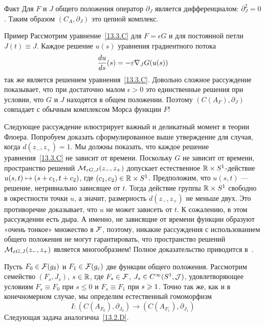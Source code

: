 \begin{thm}{Факт}\label{13.3.F}
  Для $F$ и $J$ общего положения оператор $\partial_{J}$ является
  дифференциалом: $\partial_{J}^{2}=0$.
  Таким образом $(C_{A},\partial_{J})$ это цепной комплекс.
\end{thm}

\begin{thm}{Пример}\label{13.3.G}
Рассмотрим уравнение~\ref{13.3.C} для $F = \epsilon G$ и для
  постоянной петли $J(t)\equiv J$.
  Каждое решение $u(s)$ уравнения градиентного потока
  \[
  \frac{d u}{d s} (s) = -\varepsilon\nabla_{J} G(u(s))
  \]
  так же является решением уравнения~\ref{13.3.C}.
Довольно сложное рассуждение \cite[Lemma 7.1]{HS} показывает, что при
  достаточно малом $\epsilon>0$ это единственные решения при
  условии, что $G$ и $J$ находятся в общем положении.
  Поэтому $(C(A_{F}),\partial_{J})$ совпадает с обычным комплексом
  Морса функции $F$!
\end{thm}

Следующее рассуждение илюстрирует важный и деликатный
момент в теории Флоера.
Попробуем доказать сформулированное выше утверждение для случая, когда
$d(z_{-}, z_{+})=1$.  
Мы должны показать, что каждое решение уравнения~\ref{13.3.C} не
зависит от времени.
Поскольку $G$ не зависит от времени, пространство решений
$\mathcal{M}_{\varepsilon G,J}(z_{-},z_{+})$ допускает естественное $\mathbb{R}\times
S^{1}$-действие $u(s, t) \mapsto (s\z+c_{1},t+c_{2})$, где
$(c_{1},c_{2})\in\mathbb{R}\times S^{1}$.
Предположим, что $u(s, t)$ — решение, нетривиально зависящее от $t$.
Тогда действие группы $\mathbb{R}\times S^{1}$ свободно в окрестности точки $u$,
а значит, размерность $d(z_{-}, z_{+})$ не меньше двух.
Это противоречие доказывает, что $u$ не может зависеть от $t$.
К сожалению, в этом рассуждении есть дыра.
А именно, не зависящие от времени функции образуют «очень тонкое» множество в $\mathcal{F}$, поэтому, никакие рассуждения с использованием общего положения не могут гарантировать, что пространство решений $\mathcal{M}_{\varepsilon G,J}(z_{-}, z_{+})$ является многообразием!
Полное доказательство приводится в~\cite{HS}.

Пусть $F_{0}\in\mathcal{F}(g_{\delta})$ и $F_{1}\in\mathcal{F}(g_{\varepsilon})$ две
функции общего положения. 
Рассмотрим семейство $(F_{s}, J_{s})$, $s\in\mathbb{R}$, где
$F_{s}\in\mathcal{F}$, $J_{s}\in C^{\infty}(S^{1},\mathcal{J})$, удовлетворяющее
условиям 
$F_{s}\equiv F_{0}$ при $s\le0$ и $F_{s}\equiv F_{1}$ при $s\z\ge1$.
Точно так же, как и в конечномерном случае, мы определим
естественный гомоморфизм
\[
I:(C(A_{F_{0}}),\partial_{J_{0}})\to(C(A_{F_{1}}),\partial_{J_{1}})
\]
Следующая задача аналогична~\ref{13.2.D}.

